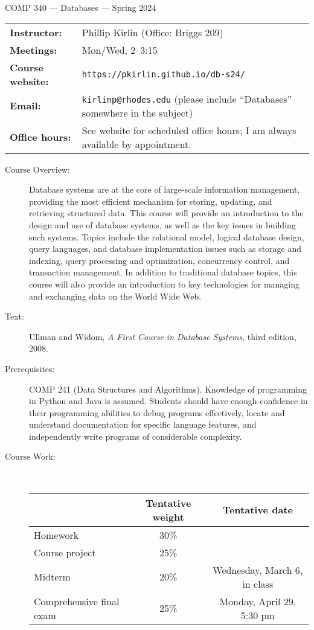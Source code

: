 \documentclass [letterpaper,11pt]{article}
\begin{document}
\begin{center}
\Large COMP 340 --- Databases --- Spring 2024
\end{center}

\noindent\begin{tabular}{@{}ll}
\textbf{Instructor:} & Phillip Kirlin (Office: Briggs 209) \\
\textbf{Meetings:} & Mon/Wed, 2--3:15 \\
\textbf{Course website:} &\texttt{https://pkirlin.github.io/db-s24/} \\
\textbf{Email:} &\texttt{kirlinp@rhodes.edu} (please include ``Databases'' somewhere in the subject)\\
\textbf{Office hours:} & See website for scheduled office hours; I am always available by appointment.
\end{tabular}
\begin{description}
\item[Course Overview:] Database systems are at the core of large-scale information management, providing the most efficient mechanism for storing, updating, and retrieving structured data. This course will provide an introduction to the design and use of database systems, as well as the key issues in building such systems. Topics include the relational model, logical database design, query languages, and database implementation issues such as storage and indexing, query processing and optimization, concurrency control, and transaction management. In addition to traditional database topics, this course will also provide an introduction to key technologies for managing and exchanging data on the World Wide Web. 

\item[Text:] Ullman and Widom, \textit{A First Course in Database Systems}, third edition, 2008.

\item[Prerequisites:] COMP 241 (Data Structures and Algorithms).  Knowledge of programming
in Python and Java is assumed.  Students should have enough confidence in their
programming abilities to debug programs effectively, locate and understand documentation for specific language features, and independently write programs of considerable complexity.

\item[Course Work:] \

\begin{tabular}{lcc} 
& Tentative weight & Tentative date \\ \hline
Homework & 30\% & \\
Course project & 25\% & \\
Midterm & 20\% & Wednesday, March 6, in class\\
Comprehensive final exam & 25\% & Monday, April 29, 5:30 pm\\
\end{tabular}


\end{description}
\end{document}
